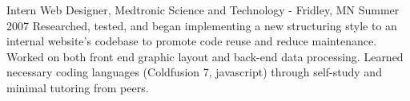 Intern Web Designer, Medtronic Science and Technology - Fridley, MN
Summer 2007
Researched, tested, and began implementing a new structuring style to an internal website’s codebase to promote code reuse and reduce maintenance.
Worked on both front end graphic layout and back-end data processing.
Learned necessary coding languages (Coldfusion 7, javascript) through self-study and minimal tutoring from peers.